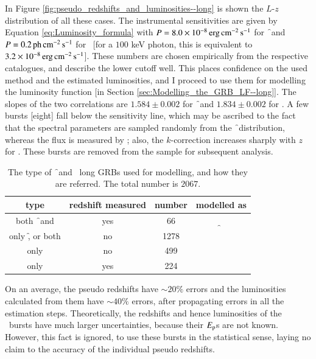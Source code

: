 In Figure \ref{fig:pseudo_redshifts_and_luminosities--long} is shown the $L$-$z$ distribution of all these cases. The instrumental sensitivities are given by Equation \ref{eq:Luminosity_formula} with $P = 8.0 \times 10^{-8} \, \rm erg \, cm^{-2} \, s^{-1}$ for \f\ and $P = 0.2 \, \rm ph \, cm^{-2} \, s^{-1}$ for \s\ [for a $100$ keV photon, this is equivalent to $3.2 \times 10^{-8} \, \rm erg \, cm^{-2} \, s^{-1}$]. These numbers are chosen empirically from the respective catalogues, and describe the lower cutoff well. This places confidence on the used method and the estimated luminosities, and I proceed to use them for modelling the luminosity function [in Section \ref{sec:Modelling_the_GRB_LF--long}]. The slopes of the two correlations are $1.584 \pm 0.002$ for \f\ and $1.834 \pm 0.002$ for \s. A few bursts [eight] fall below the sensitivity line, which may be ascribed to the fact that the spectral parameters are sampled randomly from the \f\ distribution, whereas the flux is measured by \s; also, the $k$-correction increases sharply with $z$ for \s. These bursts are removed from the sample for subsequent analysis.


\begin{table}
\caption[Categories of long GRBs used for modelling LF]{The type of \f\ and \s\ long GRBs used for modelling, and how they are referred. The total number is $2067$.}
\label{tab:GRB_numbers--long}
\begin{center}
\begin{tabular}{|c|c|c|c|}
\hline 
type & redshift measured & number & modelled as\\
\hline 
\hline 
both \f\ and \s & yes & 66 & \multirow{2}{*}{\f}\\
\cline{1-3} 
only \f, or both & no & 1278 & \\
\hline 
only \s & no & 499 & \multirow{2}{*}{\s}\\
\cline{1-3} 
only \s & yes & 224 & \\
\hline 
\end{tabular}
\end{center}
\end{table}


On an average, the pseudo redshifts have $ \sim 20 \% $ errors and the luminosities calculated from them have $ \sim 40 \% $ errors, after propagating errors in all the estimation steps. Theoretically, the redshifts and hence luminosities of the \s\ bursts have much larger uncertainties, because their $E_{\rm p}$s are not known. However, this fact is ignored, to use these bursts in the statistical sense, laying no claim to the accuracy of the individual pseudo redshifts.

